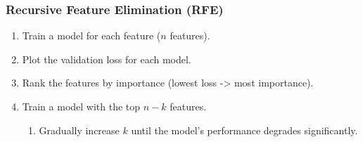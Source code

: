 \documentclass[11pt]{article}
\providecommand{\tightlist}{%
      \setlength{\itemsep}{0pt}\setlength{\parskip}{0pt}}
\begin{document}
\subsubsection{Recursive Feature Elimination
(RFE)}\label{recursive-feature-elimination-rfe}

\begin{enumerate}
\def\labelenumi{\arabic{enumi}.}
\tightlist
\item
  Train a model for each feature (\(n\) features).
\item
  Plot the validation loss for each model.
\item
  Rank the features by importance (lowest loss -\textgreater{} most
  importance).
\item
  Train a model with the top \(n-k\) features.

  \begin{enumerate}
  \def\labelenumii{\arabic{enumii}.}
  \tightlist
  \item
    Gradually increase \(k\) until the model's performance degrades
    significantly.
  \end{enumerate}
\end{enumerate}
\end{document}
